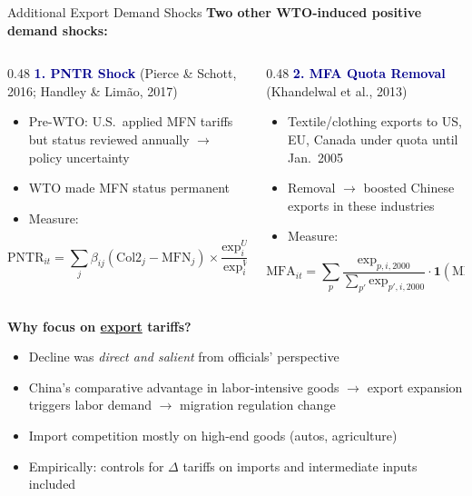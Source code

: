\documentclass[10pt,aspectratio=169,t]{beamer}
\newcommand{\hlight}[1]{\textcolor{darkblue}{\textbf{#1}}}
\newcommand{\rmark}[1]{\textcolor{alertred}{#1}}
\begin{document}
\begin{frame}{Additional Export Demand Shocks}
\textbf{Two other WTO-induced positive demand shocks:}

\bigskip
\begin{columns}[T]
\begin{column}{0.48\textwidth}
\hlight{1. PNTR Shock} (Pierce \& Schott, 2016; Handley \& Lim\~{a}o, 2017)
\begin{itemize}\setlength{\itemsep}{2pt}
    \item Pre-WTO: U.S.\ applied MFN tariffs but status reviewed annually $\rightarrow$ \rmark{policy uncertainty}
    \item WTO made MFN status permanent
    \item Measure:
\end{itemize}
\vspace{-4pt}
$$\text{PNTR}_{it} = \sum_j \beta_{ij}(\text{Col2}_j - \text{MFN}_j) \times \frac{\text{exp}_{i}^{US}}{\text{exp}_{i}^{W}}$$
\end{column}
\begin{column}{0.48\textwidth}
\hlight{2. MFA Quota Removal} (Khandelwal et al., 2013)
\begin{itemize}\setlength{\itemsep}{2pt}
    \item Textile/clothing exports to US, EU, Canada under quota until Jan.\ 2005
    \item Removal $\rightarrow$ boosted Chinese exports in these industries
    \item Measure:
\end{itemize}
\vspace{-4pt}
$$\text{MFA}_{it} = \sum_p \frac{\text{exp}_{p,i,2000}}{\sum_{p'}\text{exp}_{p',i,2000}} \cdot \mathbf{1}(\text{MFA}_p)$$
\end{column}
\end{columns}

\bigskip
\textbf{Why focus on \underline{export} tariffs?}
\begin{itemize}
    \item Decline was \textit{direct and salient} from officials' perspective
    \item China's comparative advantage in labor-intensive goods $\rightarrow$ export expansion triggers labor demand $\rightarrow$ migration regulation change
    \item Import competition mostly on high-end goods (autos, agriculture)
    \item Empirically: controls for $\Delta$ tariffs on imports and intermediate inputs included
\end{itemize}
\end{frame}
\end{document}
